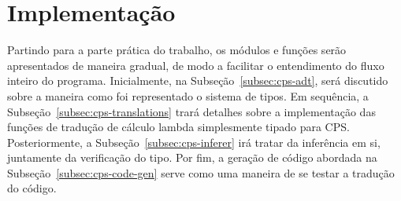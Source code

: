 \section{Implementação}\label{sec:implementacao}

Partindo para a parte prática do trabalho, os módulos e funções serão apresentados de maneira gradual, de modo a facilitar o entendimento do fluxo inteiro do programa.
Inicialmente, na Subseção~\ref{subsec:cps-adt}, será discutido sobre a maneira como foi representado o sistema de tipos.
Em sequência, a Subseção~\ref{subsec:cps-translations} trará detalhes sobre a implementação das funções de tradução de cálculo lambda simplesmente tipado para CPS.
Posteriormente, a Subseção~\ref{subsec:cps-inferer} irá tratar da inferência em si, juntamente da verificação do tipo.
Por fim, a geração de código abordada na Subseção~\ref{subsec:cps-code-gen} serve como uma maneira de se testar a tradução do código.






